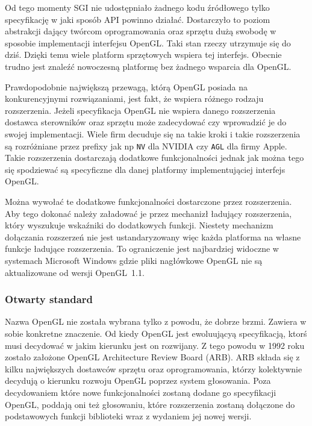 Od tego momenty SGI nie udostępniało żadnego kodu źródłowego tylko specyfikację w jaki sposób API powinno działać. Dostarczyło to poziom abstrakcji dający twórcom oprogramowania oraz sprzętu dużą swobodę w sposobie implementacji interfejsu OpenGL. Taki stan rzeczy utrzymuje się do dziś. Dzięki temu wiele platform sprzętowych wspiera tej interfejs. Obecnie trudno jest znaleźć nowoczesną platformę bez żadnego wsparcia dla OpenGL.

Prawdopodobnie największą przewagą, którą OpenGL posiada na konkurencyjnymi rozwiązaniami, jest fakt, że wspiera różnego rodzaju rozszerzenia. Jeżeli specyfikacja OpenGL nie wspiera danego rozszerzenia dostawca sterowników oraz sprzętu może zadecydować czy wprowadzić je do swojej implementacji. Wiele firm decuduje się na takie kroki i takie rozszerzenia są rozróżniane przez prefixy jak np \texttt{NV} dla NVIDIA czy \texttt{AGL} dla firmy Apple. Takie rozszerzenia dostarczają dodatkowe funkcjonalności jednak jak można tego się spodziewać są specyficzne dla danej platformy implementująciej interfejs OpenGL.

Można wywołać te dodatkowe funkcjonalności dostarczone przez rozszerzenia. Aby tego dokonać należy załadować je przez mechanizł ładujący rozszerzenia, który wyszukuje wskaźniki do dodatkowych funkcji. Niestety mechanizm dołączania rozszerzeń nie jest ustandaryzowany więc każda platforma na własne funkcje ładujące rozszerzenia. To ograniczenie jest najbardziej widoczne w systemach Microsoft Windows gdzie pliki nagłówkowe OpenGL nie są aktualizowane od wersji OpenGL~1.1.

\subsubsection{Otwarty standard}
\thispagestyle{empty}
\par\indent

Nazwa OpenGL nie została wybrana tylko z powodu, że dobrze brzmi. Zawiera w sobie konkretne znaczenie. Od kiedy OpenGL jest ewoluującyą specyfikacją, ktorś musi decydować w jakim kierunku jest on rozwijany. Z tego powodu w 1992 roku zostało założone OpenGL Architecture Review Board (ARB). ARB składa się z kilku największych dostawców sprzętu oraz oprogramowania, którzy kolektywnie decydują o kierunku rozwoju OpenGL poprzez system głosowania. Poza decydowaniem które nowe funkcjonalności zostaną dodane go specyfikacji OpenGL, poddają oni też głosowaniu, które rozszerzenia zostaną dołączone do podstawowych funkcji biblioteki wraz z wydaniem jej nowej wersji.


